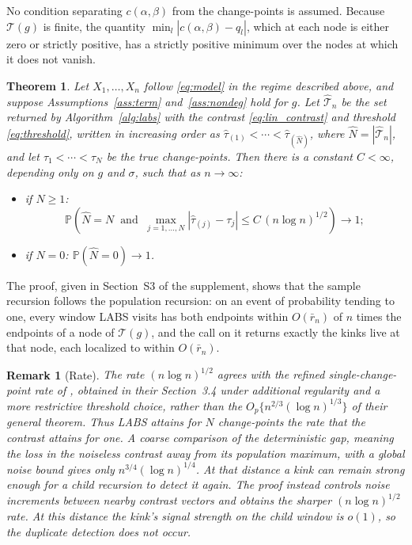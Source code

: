 \documentclass[12pt, a4paper]{article}
\newtheorem{theorem}{Theorem}[section]
\newtheorem{remark}{Remark}[section]
\begin{document}
No condition separating $c(\alpha,\beta)$ from the change-points is assumed. Because $\mathcal{T}(g)$ is finite, the quantity $\min_l |c(\alpha,\beta) - q_l|$, which at each node is either zero or strictly positive, has a strictly positive minimum over the nodes at which it does not vanish.

\begin{theorem}
\label{thm:labs_consistency}
Let $X_1, \ldots, X_n$ follow \eqref{eq:model} in the regime described above, and suppose Assumptions~\ref{ass:term} and~\ref{ass:nondeg} hold for $g$. Let $\hat{\mathcal{T}}_n$ be the set returned by Algorithm~\ref{alg:labs} with the contrast \eqref{eq:lin_contrast} and threshold \eqref{eq:threshold}, written in increasing order as $\hat\tau_{(1)} < \cdots < \hat\tau_{(\hat N)}$, where $\hat N = |\hat{\mathcal{T}}_n|$, and let $\tau_1 < \cdots < \tau_N$ be the true change-points. Then there is a constant $C < \infty$, depending only on $g$ and $\sigma$, such that as $n \to \infty$:
\begin{itemize}
\item if $N \geq 1$:
\[
\mathbb{P}\!\left( \hat{N} = N \;\;\text{and}\;\; \max_{j=1,\ldots,N} |\hat{\tau}_{(j)} - \tau_j| \leq C \, (n \log n)^{1/2} \right) \to 1;
\]
\item if $N = 0$: $\mathbb{P}(\hat N = 0) \to 1$.
\end{itemize}
\end{theorem}

The proof, given in Section~S3 of the supplement, shows that the sample recursion follows the population recursion: on an event of probability tending to one, every window LABS visits has both endpoints within $O(\bar r_n)$ of $n$ times the endpoints of a node of $\mathcal{T}(g)$, and the call on it returns exactly the kinks live at that node, each localized to within $O(\bar r_n)$.

\begin{remark}[Rate]
\label{rem:rate}
{\em
The rate $(n\log n)^{1/2}$ agrees with the refined single-change-point rate of \cite{bcf16}, obtained in their Section~3.4 under additional regularity and a more restrictive threshold choice, rather than the $O_p\{n^{2/3}(\log n)^{1/3}\}$ of their general theorem. Thus LABS attains for $N$ change-points the rate that the contrast attains for one. A coarse comparison of the deterministic gap, meaning the loss in the noiseless contrast away from its population maximum, with a global noise bound gives only $n^{3/4}(\log n)^{1/4}$. At that distance a kink can remain strong enough for a child recursion to detect it again. The proof instead controls noise increments between nearby contrast vectors and obtains the sharper $(n\log n)^{1/2}$ rate. At this distance the kink's signal strength on the child window is $o(1)$, so the duplicate detection does not occur.
}
\end{remark}
\end{document}
